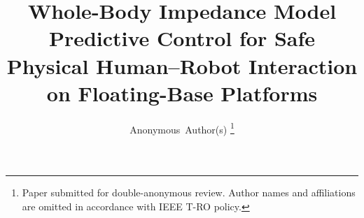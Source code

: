 \documentclass[journal]{IEEEtran}
\begin{document}
\title{Whole-Body Impedance Model Predictive Control for Safe
       Physical Human--Robot Interaction on Floating-Base Platforms}

\author{Anonymous~Author(s)%
\thanks{Paper submitted for double-anonymous review. Author names and
affiliations are omitted in accordance with IEEE T-RO policy.}}

\maketitle
\thispagestyle{empty}
\pagestyle{empty}


\end{document}
